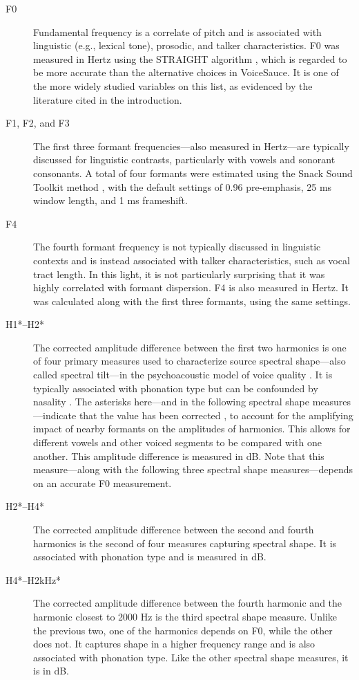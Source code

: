 \begin{description}
    \item[F0] Fundamental frequency is a correlate of pitch and is associated with linguistic (e.g., lexical tone), prosodic, and talker characteristics. F0 was measured in Hertz using the STRAIGHT algorithm \citep{kawahara_2016_straight}, which is regarded to be more accurate than the alternative choices in VoiceSauce. It is one of the more widely studied variables on this list, as evidenced by the literature cited in the introduction.
    \item[F1, F2, and F3] The first three formant frequencies---also measured in Hertz---are typically discussed for linguistic contrasts, particularly with vowels and sonorant consonants. A total of four formants were estimated using the Snack Sound Toolkit method \cite{sjolander_2004_snack}, with the default settings of 0.96 pre-emphasis, 25 ms window length, and 1 ms frameshift.
    \item[F4] The fourth formant frequency is not typically discussed in linguistic contexts and is instead associated with talker characteristics, such as vocal tract length. In this light, it is not particularly surprising that it was highly correlated with formant dispersion. F4 is also measured in Hertz. It was calculated along with the first three formants, using the same settings.
    \item[H1*--H2*] The corrected amplitude difference between the first two harmonics is one of four primary measures used to characterize source spectral shape---also called spectral tilt---in the psychoacoustic model of voice quality \citep{kreiman_2014_theory}. It is typically associated with phonation type but can be confounded by nasality \citep{garellek_2019_voice,munson_2019_phonetics}. The asterisks here---and in the following spectral shape measures---indicate that the value has been corrected \citep{iseli_2007_voice}, to account for the amplifying impact of nearby formants on the amplitudes of harmonics. This allows for different vowels and other voiced segments to be compared with one another. This amplitude difference is measured in dB. Note that this measure---along with the following three spectral shape measures---depends on an accurate F0 measurement.
    \item[H2*--H4*] The corrected amplitude difference between the second and fourth harmonics is the second of four measures capturing spectral shape. It is associated with phonation type and is measured in dB.
    \item[H4*--H2kHz*] The corrected amplitude difference between the fourth harmonic and the harmonic closest to 2000 Hz is the third spectral shape measure. Unlike the previous two, one of the harmonics depends on F0, while the other does not. It captures shape in a higher frequency range and is also associated with phonation type. Like the other spectral shape measures, it is in dB.

\end{description}
